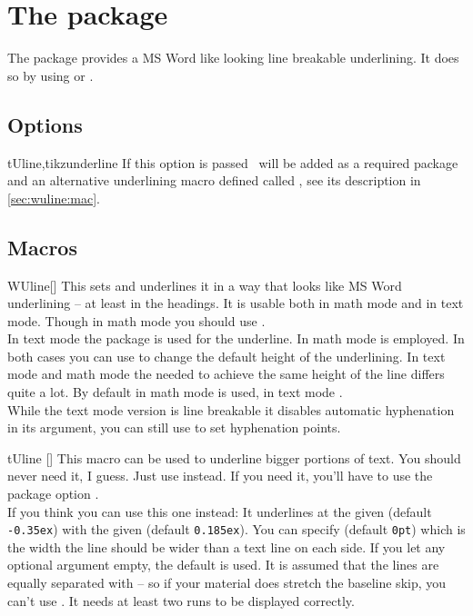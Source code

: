 \chapter{The  package}
The package provides a MS Word like looking line breakable underlining. It does
so by using  or .

\section{Options}\label{sec:wuline:options}%
\begin{describeopt}{tUline,tikzunderline}
  If this option is passed \TikZ\ will be added as a required package and an
  alternative underlining macro defined called , see its description
  in \autoref{sec:wuline:mac}.
\end{describeopt}

\section{Macros}\label{sec:wuline:mac}%
\begin{describemacro}{WUline}[]%
  This sets  and underlines it in a way that looks like MS Word
  underlining -- at least in the headings. It is usable both in math mode and in
  text mode. Though in math mode you should use .\\[\parskip]
  In text mode the  package is used for the underline. In math mode
   is employed. In both cases you can use  to
  change the default height of the underlining. In text mode and math mode the
  needed  to achieve the same height of the line differs quite a
  lot. By default in math mode \texttt{} is
  used, in text mode \texttt{}.\\[\parskip]
  While the text mode version is line breakable it disables automatic
  hyphenation in its argument, you can still use \cs{-} to set hyphenation
  points.
\end{describemacro}%
\begin{describemacro}{tUline}%
  []
  This macro can be used to underline bigger portions of text. You should never
  need it, I guess. Just use  instead. If you need it, you'll have to
  use the package option .\\[\parskip]
  If you think you can use this one instead: It underlines  at the
  given  (default \texttt{-0.35ex}) with the given 
  (default \texttt{0.185ex}). You can specify  (default
  \texttt{0pt}) which is the width the line should be wider than a text line on
  each side. If you let any optional argument empty, the default is used. It is
  assumed that the lines are equally separated with  -- so if
  your material does stretch the baseline skip, you can't use . It
  needs at least two runs to be displayed correctly.
\end{describemacro}%

